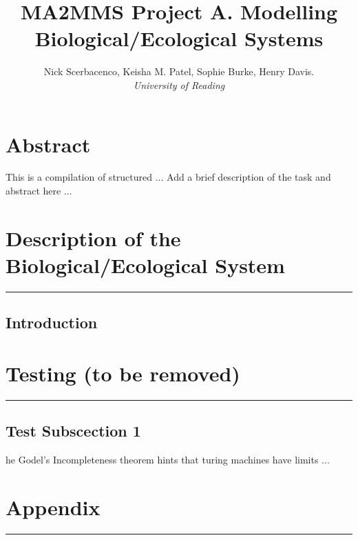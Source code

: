 \documentclass[11pt]{article}
\title{\textbf{MA2MMS Project A. Modelling Biological/Ecological Systems}}
\author{Nick Scerbacenco, Keisha M. Patel, Sophie Burke, Henry Davis. \\
        \textit{University of Reading}}
\date{ }
\begin{document}
\pagestyle{fancy}


\maketitle
\thispagestyle{empty} 

\section*{\textbf{Abstract}}
This is a compilation of structured ... Add a brief description of the task and abstract here ...

\tableofcontents

\newpage


\section{Description of the Biological/Ecological System}
\hrule height 0.8pt 
\vspace{5mm}

\subsection{Introduction}


\newpage
\section{Testing (to be removed)}
\hrule height 0.8pt 
\vspace{5mm}

\subsection{Test Subscection 1}

\lettrine[findent=2pt]{}{ } he Godel's Incompleteness theorem hints that turing machines have limits ...

\newpage 
\section*{Appendix}
\hrule height 0.8pt 
\vspace{5mm}


\end{document}

